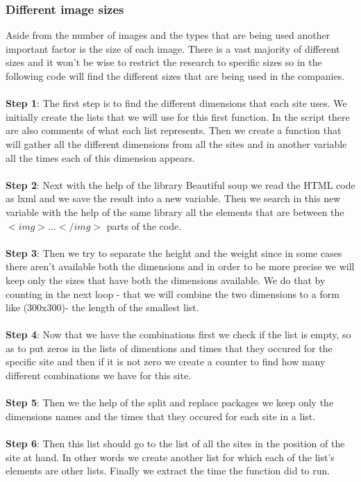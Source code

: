 \documentclass{book}
\begin{document}
\subsubsection{Different image sizes}\label{dif_img_s} 
Aside from the number of images and the types that are being used another important factor is the size of each image. There is a vast majority of different sizes and it won't be wise to restrict the research to specific sizes so in the following code will find the different sizes that are being used in the companies.\\\\
\textbf{Step 1}: The first step is to find the different dimensions that each site uses. We initially create the lists that we will use for this first function. In the script there are also comments of what each list represents. Then we create a function that will gather all the different dimensions from all the sites and in another variable all the times each of this dimension appears. \\\\
\textbf{Step 2}: Next with the help of the library Beautiful soup we read the HTML code as lxml and we save the result into a new variable. Then we search in this new variable with the help of the same library all the elements that are between the $<img>...</img>$ parts of the code.\\\\
\textbf{Step 3}: Then we try to separate the height and the weight since in some cases there aren't available both the dimensions and in order to be more precise we will keep only the sizes that have both the dimensions available. We do that by counting in the next loop - that we will combine the two dimensions to a form like (300x300)- the length of the smallest list. \\\\
\textbf{Step 4}: Now that we have the combinations first we check if the list is empty, so as to put zeros in the lists of dimentions and times that they occured for the specific site and then if it is not zero we create a counter to find how many different combinations we have for this site.\\\\
\textbf{Step 5}: Then we the help of the split and replace packages we keep only the dimensions names and the times that they occured for each site in a list.\\\\
\textbf{Step 6}: Then this list should go to the list of all the sites in the position of the site at hand. In other words we create another list for which each of the list's elements are other lists. Finally we extract the time the function did to run.\\\\
\end{document}
